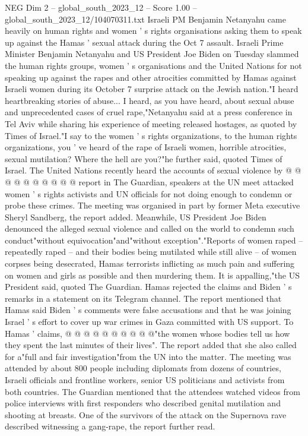 \begin{textsample}{NEG Dim 2 – global\_south\_2023\_12 – Score 1.00 – global\_south\_2023\_12/104070311.txt}  \label{ex:f2_neg_286}
Israeli PM Benjamin Netanyahu came heavily on human rights and women ' s rights organisations asking them to speak up against the Hamas ' sexual attack during the Oct 7 assault.
Israeli Prime Minister Benjamin Netanyahu and US President Joe Biden on Tuesday slammed the human rights groups, women ' s organisations and the United Nations for not speaking up against the rapes and other atrocities committed by Hamas against Israeli women during its October 7 surprise attack on the Jewish nation."I heard heartbreaking stories of abuse...
I heard, as you have heard, about sexual abuse and unprecedented cases of cruel rape,"Netanyahu said at a press conference in Tel Aviv while sharing his experience of meeting released hostages, as quoted by Times of Israel."I say to the women ' s rights organizations, to the human rights organizations, you ' ve heard of the rape of Israeli women, horrible atrocities, sexual mutilation?
Where the hell are you?"he further said, quoted Times of Israel.
The United Nations recently heard the accounts of sexual violence by @ @ @ @ @ @ @ @ @ @ report in The Guardian, speakers at the UN meet attacked women ' s rights activists and UN officials for not doing enough to condemn or probe these crimes.
The meeting was organised in part by former Meta executive Sheryl Sandberg, the report added.
Meanwhile, US President Joe Biden denounced the alleged sexual violence and called on the world to condemn such conduct"without equivocation"and"without exception"."Reports of women raped -- repeatedly raped -- and their bodies being mutilated while still alive -- of women corpses being desecrated, Hamas terrorists inflicting as much pain and suffering on women and girls as possible and then murdering them.
It is appalling,"the US President said, quoted The Guardian.
Hamas rejected the claims and Biden ' s remarks in a statement on its Telegram channel.
The report mentioned that Hamas said Biden ' s comments were false accusations and that he was joining Israel ' s effort to cover up war crimes in Gaza committed with US support.
To Hamas ' claims, @ @ @ @ @ @ @ @ @ @"the women whose bodies tell us how they spent the last minutes of their lives".
The report added that she also called for a"full and fair investigation"from the UN into the matter.
The meeting was attended by about 800 people including diplomats from dozens of countries, Israeli officials and frontline workers, senior US politicians and activists from both countries.
The Guardian mentioned that the attendees watched videos from police interviews with first responders who described genital mutilation and shooting at breasts.
One of the survivors of the attack on the Supernova rave described witnessing a gang-rape, the report further read.

\end{textsample}
